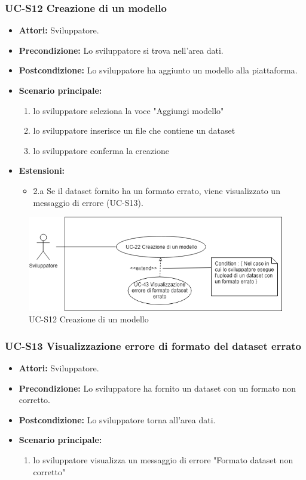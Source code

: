 	\subsubsection{UC-S12 Creazione di un modello}		
		\begin{itemize}
			\item \textbf{Attori:} Sviluppatore.
			\item \textbf{Precondizione:} Lo sviluppatore si trova nell'area dati.
			\item \textbf{Postcondizione:} Lo sviluppatore ha aggiunto un modello alla piattaforma.
			\item \textbf{Scenario principale:}
			\begin{enumerate}
				\item lo sviluppatore seleziona la voce "Aggiungi modello"
				\item lo sviluppatore inserisce un file che contiene un dataset
				\item lo sviluppatore conferma la creazione
			\end{enumerate}
			\item \textbf{Estensioni:}
				\begin{itemize}
					\item 2.a Se il dataset fornito ha un formato errato, viene visualizzato un messaggio di errore (UC-S13).
				\end{itemize}
		\end{itemize}
		
		\begin{figure}[h]
			\centering
			\includegraphics[scale=0.7]{images/UC-22.png}
				\caption{UC-S12 Creazione di un modello}
		\end{figure}	
	
	\subsubsection{UC-S13 Visualizzazione errore di formato del dataset errato}	
	\begin{itemize}					
			\item \textbf{Attori:} Sviluppatore.
			\item \textbf{Precondizione:} Lo sviluppatore ha fornito un dataset con un formato non corretto.
			\item \textbf{Postcondizione:} Lo sviluppatore torna all'area dati.
			\item \textbf{Scenario principale:}
				\begin{enumerate}
					\item lo sviluppatore visualizza un messaggio di errore "Formato dataset non corretto"
				\end{enumerate}	
		\end{itemize}		
	

